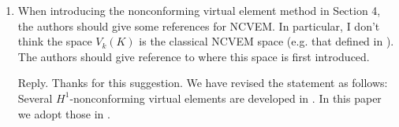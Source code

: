 \documentclass[10pt]{amsart}
\theoremstyle{definition}
\theoremstyle{remark}
\begin{document}
\begin{enumerate}[1.]



\medskip

\item \textsf{When introducing the nonconforming virtual element method in Section 4, the authors should give some references for NCVEM. In particular, I don’t think the space $V_k(K)$ is the classical NCVEM space (e.g. that defined in \cite{AyusodeDiosLipnikovManzini2016}). The authors should give reference to where this space is first introduced.}

\smallskip \noindent \textcolor[rgb]{1.00,0.00,0.00}{Reply.}
Thanks for this suggestion. We have revised the statement as follows:
Several $H^1$-nonconforming virtual elements are developed in \cite{AyusodeDiosLipnikovManzini2016,CangianiManziniSutton2017,ChenHuang2020ncvem,Huang2020}.
In this paper we adopt those in \cite{CangianiManziniSutton2017,ChenHuang2020ncvem}.

\medskip


\end{enumerate}
\end{document}
